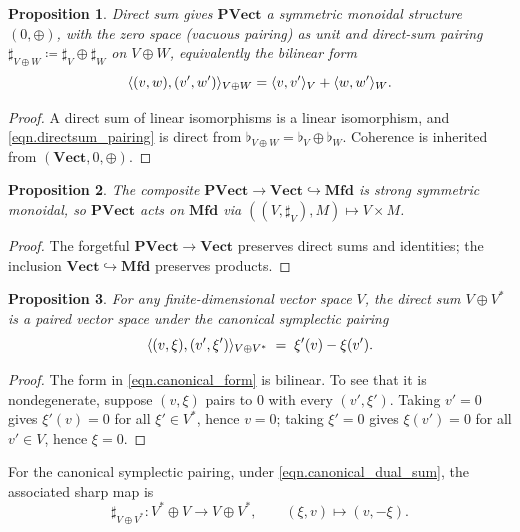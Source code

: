 \documentclass[11pt, oneside, article]{memoir}
\theoremstyle{definition}
\theoremstyle{plain}
\newtheorem{proposition}[proposition]{Proposition}
\DeclarePairedDelimiter{\pairing}{\langle}{\rangle}
\newcommand{\Cat}[1]{\mathbf{#1}}%
\newcommand{\vect}{\Cat{Vect}}
\newcommand{\mfd}{\Cat{Mfd}}
\newcommand{\pvect}{\Cat{PVect}}
\begin{document}
\begin{proposition}\label{prop.pnla_monoidal}
Direct sum gives $\pvect$ a symmetric monoidal structure $(0,\oplus)$, with the zero space (vacuous pairing) as unit and direct-sum pairing $\sharp_{V\oplus W}\coloneqq\sharp_V\oplus\sharp_W$ on $V\oplus W$, equivalently the bilinear form
\begin{equation}\label{eqn.directsum_pairing}
\pairing{(v,w),(v',w')}_{V\oplus W} = \pairing{v,v'}_V+\pairing{w,w'}_W.
\end{equation}
\end{proposition}

\begin{proof}
A direct sum of linear isomorphisms is a linear isomorphism, and \eqref{eqn.directsum_pairing} is direct from $\flat_{V\oplus W}=\flat_V\oplus\flat_W$. Coherence is inherited from $(\vect,0,\oplus)$.\qedhere
\end{proof}

\begin{proposition}\label{prop.pnla_smc_action}
The composite $\pvect\to\vect\hookrightarrow\mfd$ is strong symmetric monoidal, so $\pvect$ acts on $\mfd$ via $((V,\sharp_V),M)\mapsto V\times M$.
\end{proposition}

\begin{proof}
The forgetful $\pvect\to\vect$ preserves direct sums and identities; the inclusion $\vect\hookrightarrow\mfd$ preserves products.\qedhere
\end{proof}

\begin{proposition}\label{prop.canonical_symplectic_pairing}
For any finite-dimensional vector space $V$, the direct sum $V\oplus V^*$ is a paired vector space under the \emph{canonical symplectic pairing}
\begin{equation}\label{eqn.canonical_form}
\pairing{(v,\xi),(v',\xi')}_{V\oplus V^*} \;=\; \xi'(v)-\xi(v').
\end{equation}
\end{proposition}

\begin{proof}
The form in \eqref{eqn.canonical_form} is bilinear. To see that it is nondegenerate, suppose $(v,\xi)$ pairs to $0$ with every $(v',\xi')$. Taking $v'=0$ gives $\xi'(v)=0$ for all $\xi'\in V^*$, hence $v=0$; taking $\xi'=0$ gives $\xi(v')=0$ for all $v'\in V$, hence $\xi=0$.\qedhere
\end{proof}

For the canonical symplectic pairing, under \eqref{eqn.canonical_dual_sum}, the associated sharp map is
\begin{equation}\label{eqn.canonical_sharp}
\sharp_{V\oplus V^*}\colon V^*\oplus V\to V\oplus V^*,\qquad(\xi,v)\mapsto(v,-\xi).
\end{equation}
\end{document}
